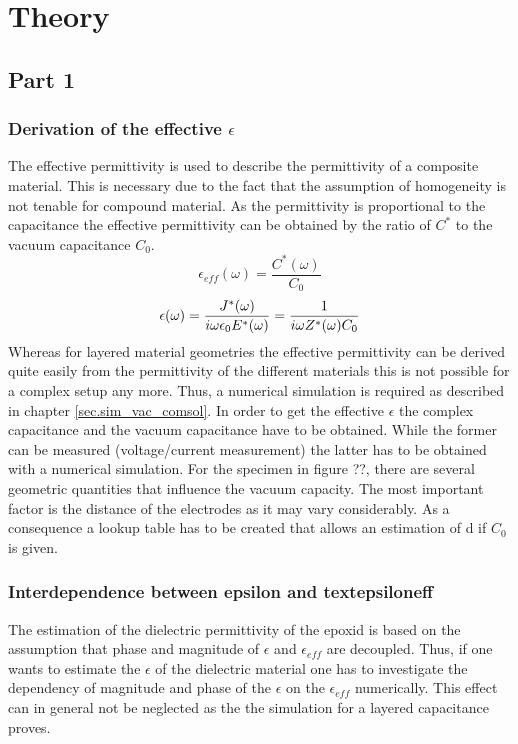\chapter{Theory}
\section{Part 1}
\subsection{Derivation of the effective $\epsilon$}
The effective permittivity is used to describe the permittivity of a composite material. This is necessary due to the fact that the assumption of homogeneity is not tenable for compound material. As the permittivity is proportional to the capacitance the effective permittivity can be obtained by the ratio of $C^*$ to the vacuum capacitance $C_0$.\\

\begin{equation}
\epsilon_{eff}(\omega)= \frac{C^*(\omega)}{C_0} 
\end{equation}
\begin{equation}
\epsilon(\omega)=\frac{J^*(\omega)}{i \omega \epsilon_0 E^*(\omega)} = \frac{1}{i \omega Z^*(\omega) C_0}\\
\end{equation}
Whereas for layered material geometries the effective permittivity can be derived quite easily from the permittivity of the different materials this is not possible for a complex setup any more. Thus, a numerical simulation is required as described in chapter \ref{sec.sim_vac_comsol}. In order to get the effective $\epsilon$ the complex capacitance and the vacuum capacitance have to be obtained. While the former can be measured (voltage/current measurement) the latter has to be obtained with a numerical simulation. 
For the specimen in figure ??, there are several geometric quantities that influence the vacuum capacity. The most important factor is the distance of the electrodes as it may vary considerably. As a consequence a lookup table has to be created that allows an estimation of d if $C_0$ is given.


 


\subsection{Interdependence between epsilon and textepsiloneff} 
The estimation of the dielectric permittivity of the epoxid is based on the assumption that phase and magnitude of $\epsilon$ and $\epsilon_{eff}$ are decoupled. Thus, if one wants to estimate the $\epsilon$ of the dielectric material one has to investigate the dependency of magnitude and phase of the $\epsilon$ on the $\epsilon_{eff}$ numerically. This effect can in general not be neglected as the the simulation for a layered capacitance proves.  


